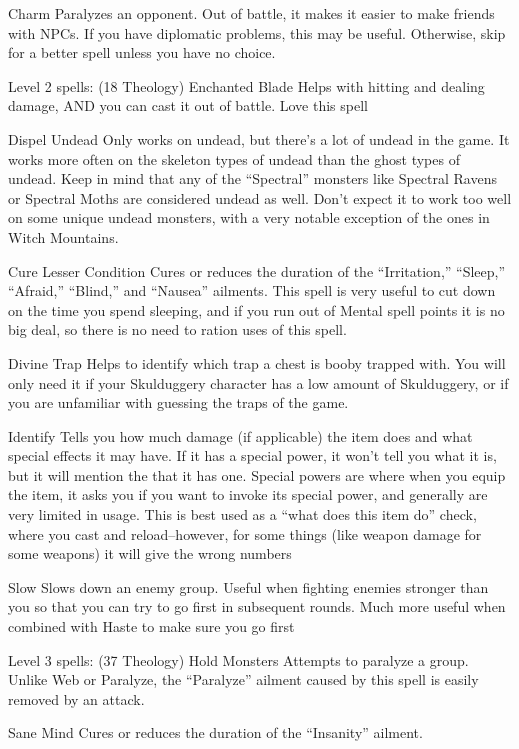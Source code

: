 \documentclass[12pt]{article}
\begin{document}
Charm Paralyzes an opponent. Out of battle, it makes it easier to make
friends with NPCs. If you have diplomatic problems, this may be useful.
Otherwise, skip for a better spell unless you have no choice.

Level 2 spells: (18 Theology) Enchanted Blade Helps with hitting and
dealing damage, AND you can cast it out of battle. Love this spell

Dispel Undead Only works on undead, but there's a lot of undead in the
game. It works more often on the skeleton types of undead than the ghost
types of undead. Keep in mind that any of the ``Spectral'' monsters like
Spectral Ravens or Spectral Moths are considered undead as well. Don't
expect it to work too well on some unique undead monsters, with a very
notable exception of the ones in Witch Mountains.

Cure Lesser Condition Cures or reduces the duration of the
``Irritation,'' ``Sleep,'' ``Afraid,'' ``Blind,'' and ``Nausea''
ailments. This spell is very useful to cut down on the time you spend
sleeping, and if you run out of Mental spell points it is no big deal,
so there is no need to ration uses of this spell.

Divine Trap Helps to identify which trap a chest is booby trapped with.
You will only need it if your Skulduggery character has a low amount of
Skulduggery, or if you are unfamiliar with guessing the traps of the
game.

Identify Tells you how much damage (if applicable) the item does and
what special effects it may have. If it has a special power, it won't
tell you what it is, but it will mention the that it has one. Special
powers are where when you equip the item, it asks you if you want to
invoke its special power, and generally are very limited in usage. This
is best used as a ``what does this item do'' check, where you cast and
reload--however, for some things (like weapon damage for some weapons)
it will give the wrong numbers

Slow Slows down an enemy group. Useful when fighting enemies stronger
than you so that you can try to go first in subsequent rounds. Much more
useful when combined with Haste to make sure you go first

Level 3 spells: (37 Theology) Hold Monsters Attempts to paralyze a
group. Unlike Web or Paralyze, the ``Paralyze'' ailment caused by this
spell is easily removed by an attack.

Sane Mind Cures or reduces the duration of the ``Insanity'' ailment.
\end{document}
